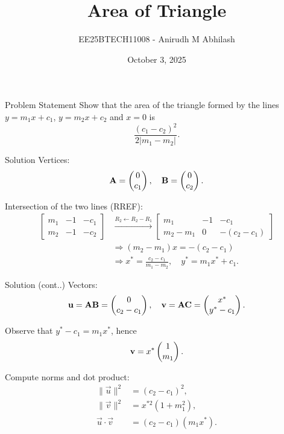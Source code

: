 \documentclass{beamer}
\title{Area of Triangle}
\author{EE25BTECH11008 - Anirudh M Abhilash}
\date{October 3, 2025}
\begin{document}
\begin{frame}
\titlepage
\end{frame}

\begin{frame}{Problem Statement}
Show that the area of the triangle formed by the lines $y=m_1x+c_1$, $y=m_2x+c_2$ and $x=0$ is
\[
\frac{(c_1-c_2)^2}{2\lvert m_1-m_2\rvert}.
\]
\end{frame}

\begin{frame}{Solution}
Vertices:
\[
\mathbf{A} = \begin{pmatrix}0\\c_1\end{pmatrix}, \quad \mathbf{B} = \begin{pmatrix}0\\c_2\end{pmatrix}.
\]

Intersection of the two lines (RREF):
\begin{align}
\left[\begin{array}{cc|c}
 m_1 & -1 & -c_1 \\
 m_2 & -1 & -c_2
\end{array}\right]
&\xrightarrow{R_2 \leftarrow R_2 - R_1}
\left[\begin{array}{cc|c}
 m_1 & -1 & -c_1 \\
 m_2-m_1 & 0 & -(c_2-c_1)
\end{array}\right] \\
&\Rightarrow (m_2-m_1)x = -(c_2-c_1) \nonumber \\
&\Rightarrow x^* = \frac{c_2-c_1}{m_1-m_2}, \quad y^* = m_1 x^* + c_1.
\end{align}
\end{frame}

\begin{frame}{Solution (cont..)}
Vectors:
\[
\mathbf{u} = \mathbf{AB} = \begin{pmatrix}0\\c_2-c_1\end{pmatrix}, \quad
\mathbf{v} = \mathbf{AC} = \begin{pmatrix}x^*\\y^*-c_1\end{pmatrix}.
\]

Observe that $y^* - c_1 = m_1 x^*$, hence
\[
\mathbf{v} = x^* \begin{pmatrix}1\\m_1\end{pmatrix}.
\]

Compute norms and dot product:
\begin{align}
\|\vec{u}\|^2 &= (c_2-c_1)^2, \\
\|\vec{v}\|^2 &= x^{*2}(1+m_1^2), \\
\vec{u}\cdot \vec{v} &= (c_2-c_1)(m_1 x^*).
\end{align}
\end{frame}
\end{document}
